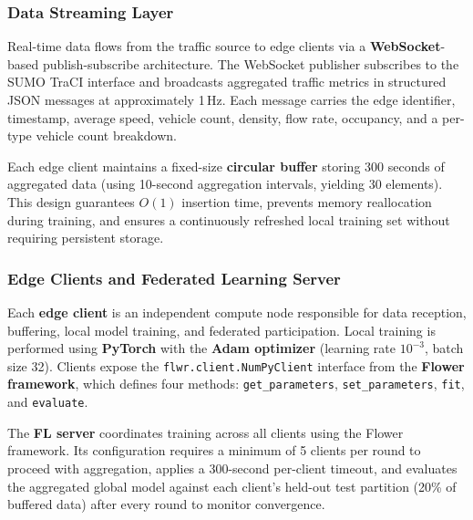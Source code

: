 \documentclass[pdflatex,sn-mathphys-num]{sn-jnl}
\theoremstyle{thmstyleone}
\theoremstyle{thmstyletwo}
\theoremstyle{thmstylethree}
\begin{document}
\subsubsection{Data Streaming Layer}

Real-time data flows from the traffic source to edge clients via a
\textbf{WebSocket}-based publish-subscribe architecture. The WebSocket publisher
subscribes to the SUMO TraCI interface and broadcasts aggregated traffic metrics
in structured JSON messages at approximately 1\,Hz. Each message carries the
edge identifier, timestamp, average speed, vehicle count, density, flow rate,
occupancy, and a per-type vehicle count breakdown.

Each edge client maintains a fixed-size \textbf{circular buffer} storing 300
seconds of aggregated data (using 10-second aggregation intervals, yielding 30
elements). This design guarantees $O(1)$ insertion time, prevents memory
reallocation during training, and ensures a continuously refreshed local training
set without requiring persistent storage.

\subsubsection{Edge Clients and Federated Learning Server}

Each \textbf{edge client} is an independent compute node responsible for data
reception, buffering, local model training, and federated participation. Local
training is performed using \textbf{PyTorch} with the \textbf{Adam optimizer}
(learning rate $10^{-3}$, batch size 32). Clients expose the
\texttt{flwr.client.NumPyClient} interface from the \textbf{Flower framework},
which defines four methods: \texttt{get\_parameters}, \texttt{set\_parameters},
\texttt{fit}, and \texttt{evaluate}.

The \textbf{FL server} coordinates training across all clients using the Flower
framework. Its configuration requires a minimum of 5 clients per round to proceed
with aggregation, applies a 300-second per-client timeout, and evaluates the
aggregated global model against each client's held-out test partition (20\% of
buffered data) after every round to monitor convergence.

\end{document}
